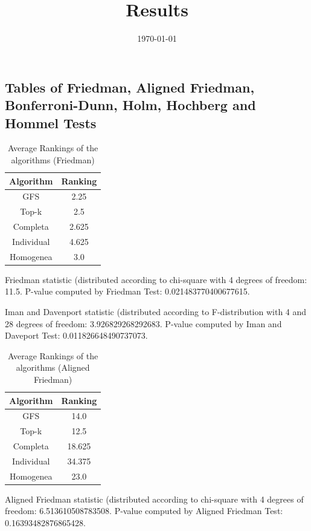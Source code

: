 \documentclass[a4paper,10pt]{article}
\title{Results}
\author{}
\date{\today}
\begin{document}
\begin{landscape}
\oddsidemargin 0in \topmargin 0in\maketitle
\section{Tables of Friedman, Aligned Friedman, Bonferroni-Dunn, Holm, Hochberg and Hommel Tests}
\begin{table}[!htp]
\centering
\caption{Average Rankings of the algorithms (Friedman)
}\begin{tabular}{c|c}
Algorithm&Ranking\\
\hline
GFS&2.25\\
Top-k&2.5\\
Completa&2.625\\
Individual&4.625\\
Homogenea&3.0\\
\end{tabular}
\end{table}


Friedman statistic (distributed according to chi-square with 4 degrees of freedom: 11.5. 
P-value computed by Friedman Test: 0.021483770400677615.\newline

Iman and Davenport statistic (distributed according to F-distribution with 4 and 28 degrees of freedom: 3.926829268292683. 
P-value computed by Iman and Daveport Test: 0.011826648490737073.\newline


\newpage

\begin{table}[!htp]
\centering
\caption{Average Rankings of the algorithms (Aligned Friedman)
}\begin{tabular}{c|c}
Algorithm&Ranking\\
\hline
GFS&14.0\\
Top-k&12.5\\
Completa&18.625\\
Individual&34.375\\
Homogenea&23.0\\
\end{tabular}
\end{table}


Aligned Friedman statistic (distributed according to chi-square with 4 degrees of freedom: 6.513610508783508. 
P-value computed by Aligned Friedman Test: 0.16393482876865428.\newline



\end{landscape}
\end{document}
